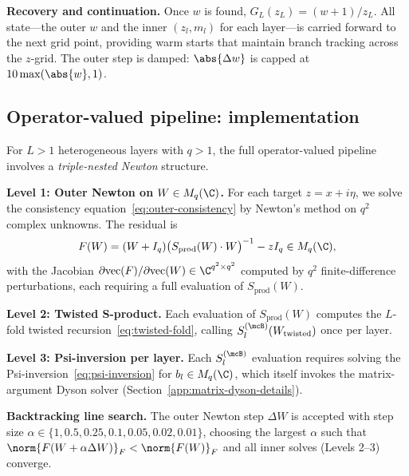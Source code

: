 \medskip
\noindent\textbf{Recovery and continuation.}
Once $w$ is found, $G_L(z_L) = (w + 1)/z_L$. All state---the outer $w$ and the inner $(z_l, m_l)$ for each layer---is carried forward to the next grid point, providing warm starts that maintain branch tracking across the $z$-grid. The outer step is damped: $\abs{\Delta w}$ is capped at $10 \max(\abs{w}, 1)$.

\subsection{Operator-valued pipeline: implementation}\label{app:ov-pipeline}

For $L > 1$ heterogeneous layers with $q > 1$, the full operator-valued pipeline involves a \emph{triple-nested Newton} structure.

\medskip
\noindent\textbf{Level 1: Outer Newton on $W \in M_q(\C)$.}
For each target $z = x + i\eta$, we solve the consistency equation~\eqref{eq:outer-consistency} by Newton's method on $q^2$ complex unknowns. The residual is
\begin{equation}\label{eq:ov-outer-residual-app}
F(W) = (W + I_q)\bigl(S_{\mathrm{prod}}(W) \cdot W\bigr)^{-1} - z I_q \in M_q(\C),
\end{equation}
with the Jacobian $\partial \mathrm{vec}(F)/\partial \mathrm{vec}(W) \in \C^{q^2 \times q^2}$ computed by $q^2$ finite-difference perturbations, each requiring a full evaluation of $S_{\mathrm{prod}}(W)$.

\medskip
\noindent\textbf{Level 2: Twisted S-product.}
Each evaluation of $S_{\mathrm{prod}}(W)$ computes the $L$-fold twisted recursion~\eqref{eq:twisted-fold}, calling $S_l^{(\mcB)}(W_{\mathrm{twisted}})$ once per layer.

\medskip
\noindent\textbf{Level 3: Psi-inversion per layer.}
Each $S_l^{(\mcB)}$ evaluation requires solving the Psi-inversion~\eqref{eq:psi-inversion} for $b_l \in M_q(\C)$, which itself invokes the matrix-argument Dyson solver (Section~\ref{app:matrix-dyson-details}).

\medskip
\noindent\textbf{Backtracking line search.}
The outer Newton step $\Delta W$ is accepted with step size $\alpha \in \{1, 0.5, 0.25, 0.1, 0.05, 0.02, 0.01\}$, choosing the largest $\alpha$ such that $\norm{F(W + \alpha \Delta W)}_F < \norm{F(W)}_F$ and all inner solves (Levels 2--3) converge.

